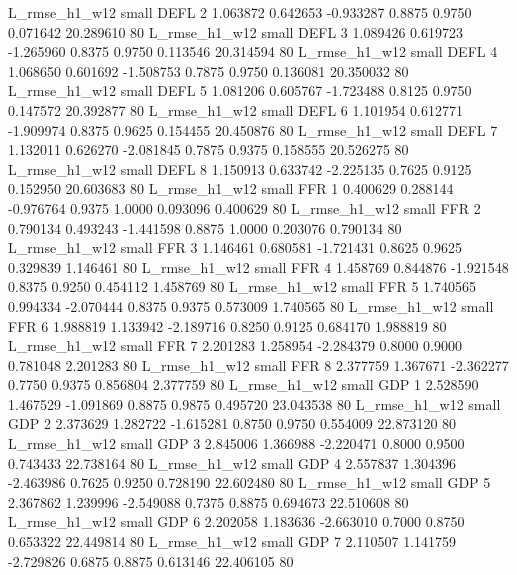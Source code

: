  L_rmse_h1_w12      small     DEFL                 2 1.063872 0.642653 -0.933287 0.8875 0.9750  0.071642   20.289610 80
 L_rmse_h1_w12      small     DEFL                 3 1.089426 0.619723 -1.265960 0.8375 0.9750  0.113546   20.314594 80
 L_rmse_h1_w12      small     DEFL                 4 1.068650 0.601692 -1.508753 0.7875 0.9750  0.136081   20.350032 80
 L_rmse_h1_w12      small     DEFL                 5 1.081206 0.605767 -1.723488 0.8125 0.9750  0.147572   20.392877 80
 L_rmse_h1_w12      small     DEFL                 6 1.101954 0.612771 -1.909974 0.8375 0.9625  0.154455   20.450876 80
 L_rmse_h1_w12      small     DEFL                 7 1.132011 0.626270 -2.081845 0.7875 0.9375  0.158555   20.526275 80
 L_rmse_h1_w12      small     DEFL                 8 1.150913 0.633742 -2.225135 0.7625 0.9125  0.152950   20.603683 80
 L_rmse_h1_w12      small      FFR                 1 0.400629 0.288144 -0.976764 0.9375 1.0000  0.093096    0.400629 80
 L_rmse_h1_w12      small      FFR                 2 0.790134 0.493243 -1.441598 0.8875 1.0000  0.203076    0.790134 80
 L_rmse_h1_w12      small      FFR                 3 1.146461 0.680581 -1.721431 0.8625 0.9625  0.329839    1.146461 80
 L_rmse_h1_w12      small      FFR                 4 1.458769 0.844876 -1.921548 0.8375 0.9250  0.454112    1.458769 80
 L_rmse_h1_w12      small      FFR                 5 1.740565 0.994334 -2.070444 0.8375 0.9375  0.573009    1.740565 80
 L_rmse_h1_w12      small      FFR                 6 1.988819 1.133942 -2.189716 0.8250 0.9125  0.684170    1.988819 80
 L_rmse_h1_w12      small      FFR                 7 2.201283 1.258954 -2.284379 0.8000 0.9000  0.781048    2.201283 80
 L_rmse_h1_w12      small      FFR                 8 2.377759 1.367671 -2.362277 0.7750 0.9375  0.856804    2.377759 80
 L_rmse_h1_w12      small      GDP                 1 2.528590 1.467529 -1.091869 0.8875 0.9875  0.495720   23.043538 80
 L_rmse_h1_w12      small      GDP                 2 2.373629 1.282722 -1.615281 0.8750 0.9750  0.554009   22.873120 80
 L_rmse_h1_w12      small      GDP                 3 2.845006 1.366988 -2.220471 0.8000 0.9500  0.743433   22.738164 80
 L_rmse_h1_w12      small      GDP                 4 2.557837 1.304396 -2.463986 0.7625 0.9250  0.728190   22.602480 80
 L_rmse_h1_w12      small      GDP                 5 2.367862 1.239996 -2.549088 0.7375 0.8875  0.694673   22.510608 80
 L_rmse_h1_w12      small      GDP                 6 2.202058 1.183636 -2.663010 0.7000 0.8750  0.653322   22.449814 80
 L_rmse_h1_w12      small      GDP                 7 2.110507 1.141759 -2.729826 0.6875 0.8875  0.613146   22.406105 80
